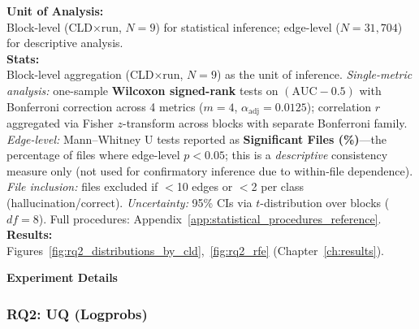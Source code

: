 \textbf{Unit of Analysis:}\\
Block-level (CLD$\times$run, $N=9$) for statistical inference; edge-level ($N=31{,}704$) for descriptive analysis.\\
\textbf{Stats:}\\
Block-level aggregation (CLD$\times$run, $N{=}9$) as the unit of inference. \textit{Single-metric analysis:} one-sample \textbf{Wilcoxon signed-rank} tests on $(\mathrm{AUC}-0.5)$ with Bonferroni correction across 4 metrics ($m{=}4$, $\alpha_{\text{adj}}{=}0.0125$); correlation $r$ aggregated via Fisher $z$-transform across blocks with separate Bonferroni family. \textit{Edge-level:} Mann--Whitney U tests reported as \textbf{Significant Files (\%)}---the percentage of files where edge-level $p<0.05$; this is a \textit{descriptive} consistency measure only (not used for confirmatory inference due to within-file dependence). \textit{File inclusion:} files excluded if $<$10 edges or $<$2 per class (hallucination/correct). \textit{Uncertainty:} 95\% CIs via $t$-distribution over blocks ($df{=}8$). Full procedures: Appendix~\ref{app:statistical_procedures_reference}.\\
\textbf{Results:}\\
Figures~\ref{fig:rq2_distributions_by_cld},~\ref{fig:rq2_rfe} (Chapter~\ref{ch:results}).

\noindent\textbf{Experiment Details}

\subsubsection{RQ2: UQ (Logprobs)}
\label{sec:rq2_uq_logprobs}

